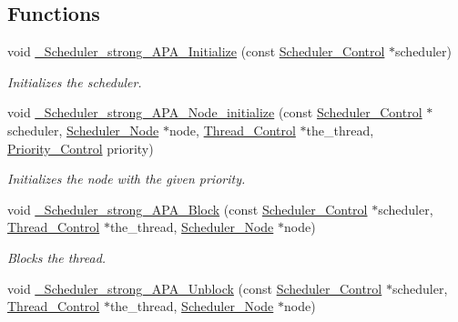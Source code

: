 \subsection*{Functions}
\begin{DoxyCompactItemize}
\item 
void \mbox{\hyperlink{group__RTEMSScoreSchedulerStrongAPA_gafcd6fde337d7542784698219322b6365}{\+\_\+\+Scheduler\+\_\+strong\+\_\+\+A\+P\+A\+\_\+\+Initialize}} (const \mbox{\hyperlink{struct__Scheduler__Control}{Scheduler\+\_\+\+Control}} $\ast$scheduler)
\begin{DoxyCompactList}\small\item\em Initializes the scheduler. \end{DoxyCompactList}\item 
void \mbox{\hyperlink{group__RTEMSScoreSchedulerStrongAPA_ga1cde4345d4dc0b5a37a696fa446bb47e}{\+\_\+\+Scheduler\+\_\+strong\+\_\+\+A\+P\+A\+\_\+\+Node\+\_\+initialize}} (const \mbox{\hyperlink{struct__Scheduler__Control}{Scheduler\+\_\+\+Control}} $\ast$scheduler, \mbox{\hyperlink{structScheduler__Node}{Scheduler\+\_\+\+Node}} $\ast$node, \mbox{\hyperlink{struct__Thread__Control}{Thread\+\_\+\+Control}} $\ast$the\+\_\+thread, \mbox{\hyperlink{group__RTEMSScorePriority_ga59d02b58072d31a9a1cfe644557aefe2}{Priority\+\_\+\+Control}} priority)
\begin{DoxyCompactList}\small\item\em Initializes the node with the given priority. \end{DoxyCompactList}\item 
void \mbox{\hyperlink{group__RTEMSScoreSchedulerStrongAPA_ga0f3ca9f9dcaff88a5df871622caf5e3f}{\+\_\+\+Scheduler\+\_\+strong\+\_\+\+A\+P\+A\+\_\+\+Block}} (const \mbox{\hyperlink{struct__Scheduler__Control}{Scheduler\+\_\+\+Control}} $\ast$scheduler, \mbox{\hyperlink{struct__Thread__Control}{Thread\+\_\+\+Control}} $\ast$the\+\_\+thread, \mbox{\hyperlink{structScheduler__Node}{Scheduler\+\_\+\+Node}} $\ast$node)
\begin{DoxyCompactList}\small\item\em Blocks the thread. \end{DoxyCompactList}\item 
void \mbox{\hyperlink{group__RTEMSScoreSchedulerStrongAPA_ga6b96ab0939d82ee5813092159265840e}{\+\_\+\+Scheduler\+\_\+strong\+\_\+\+A\+P\+A\+\_\+\+Unblock}} (const \mbox{\hyperlink{struct__Scheduler__Control}{Scheduler\+\_\+\+Control}} $\ast$scheduler, \mbox{\hyperlink{struct__Thread__Control}{Thread\+\_\+\+Control}} $\ast$the\+\_\+thread, \mbox{\hyperlink{structScheduler__Node}{Scheduler\+\_\+\+Node}} $\ast$node)

\end{DoxyCompactItemize}
